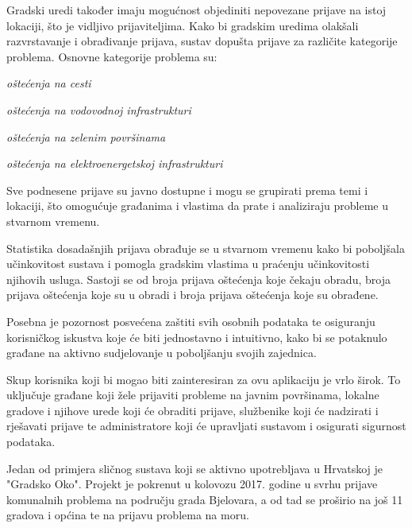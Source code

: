 \noindent Gradski uredi također imaju mogućnost objediniti nepovezane prijave na istoj lokaciji, što je vidljivo prijaviteljima.
\noindent Kako bi gradskim uredima olakšali razvrstavanje i obrađivanje prijava, sustav dopušta prijave za različite kategorije problema. Osnovne kategorije problema su:

\begin{packed_item}
	\item \textit{oštećenja na cesti}
	\item \textit{oštećenja na vodovodnoj infrastrukturi}
	\item \textit{oštećenja na zelenim površinama}
	\item \textit{oštećenja na elektroenergetskoj infrastrukturi}
\end{packed_item}

\noindent Sve podnesene prijave su javno dostupne i mogu se grupirati prema temi i lokaciji, što omogućuje građanima i vlastima da prate i analiziraju probleme u stvarnom vremenu.

\noindent Statistika dosadašnjih prijava obrađuje se u stvarnom vremenu kako bi poboljšala učinkovitost sustava i pomogla gradskim vlastima u praćenju učinkovitosti njihovih usluga. Sastoji se od broja prijava oštećenja koje čekaju obradu, broja prijava oštećenja koje su u obradi i broja prijava oštećenja koje su obrađene.

\noindent Posebna je pozornost posvećena zaštiti svih osobnih podataka te osiguranju korisničkog iskustva koje će biti jednostavno i intuitivno, kako bi se potaknulo građane na aktivno sudjelovanje u poboljšanju svojih zajednica.

\noindent Skup korisnika koji bi mogao biti zainteresiran za ovu aplikaciju je vrlo širok. To uključuje građane koji žele prijaviti probleme na javnim površinama, lokalne gradove i njihove urede koji će obraditi prijave, službenike koji će nadzirati i rješavati prijave te administratore koji će upravljati sustavom i osigurati sigurnost podataka.

\noindent Jedan od primjera sličnog sustava koji se aktivno upotrebljava u Hrvatskoj je "Gradsko Oko". Projekt je pokrenut u kolovozu 2017. godine u svrhu prijave komunalnih problema na području grada Bjelovara, a od tad se proširio na još 11 gradova i općina te na prijavu problema na moru.

